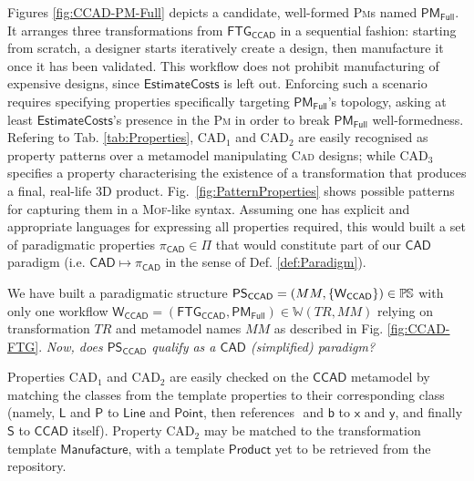 Figures \ref{fig:CCAD-PM-Full} depicts a candidate, well-formed \textsc{Pm}s 
named $\mathsf{PM_{Full}}$.
It arranges three transformations from $\mathsf{FTG_{CCAD}}$ in a sequential 
fashion: starting from scratch, a designer starts iteratively create a
design, then manufacture it once it has been validated. This workflow does not 
prohibit manufacturing of expensive designs, since $\mathsf{EstimateCosts}$ is 
left out.
Enforcing such a scenario requires specifying properties specifically targeting 
$\mathsf{PM_{Full}}$'s topology, asking at least $\mathsf{EstimateCosts}$'s 
presence in the \textsc{Pm} in order to break $\mathsf{PM_{Full}}$ 
well-formedness.
%
Refering to Tab. \ref{tab:Properties}, $\mbox{CAD}_1$ and $\mbox{CAD}_2$ are 
easily recognised as property 
patterns over a metamodel manipulating \textsc{Cad} designs; while 
$\mbox{CAD}_3$ specifies a property characterising the existence of a 
transformation that produces a final, real-life 3D product. Fig.~\ref{fig:PatternProperties} 
shows possible patterns for capturing them in a 
\textsc{Mof}-like syntax. Assuming one has explicit and appropriate languages 
for expressing all properties required, this would built a set of 
paradigmatic properties $\pi_{\mathsf{CAD}}\in\Pi$ that would constitute part of 
our $\mathsf{CAD}$ paradigm (i.e. $\mathsf{CAD} \mapsto \pi_{\mathsf{CAD}}$ in 
the sense of Def. \ref{def:Paradigm}).


We have built a paradigmatic structure $\mathsf{PS_{CCAD}} = (MM, 
\{\mathsf{W_{CCAD}}\})\in\mathbb{P}\mskip-1mu\mathbb{S}$ with only one workflow $\mathsf{W_{CCAD}} = 
(\mathsf{FTG_{CCAD}}, \mathsf{PM_{Full}})\in\mathbb{W}(TR, MM)$ relying on 
transformation $TR$ and metamodel names $MM$ as described in Fig. 
\ref{fig:CCAD-FTG}. \emph{Now, does $\mathsf{PS_{CCAD}}$ qualify as a 
$\mathsf{CAD}$ (simplified) paradigm?}

Properties $\mbox{CAD}_1$ and $\mbox{CAD}_2$ are easily checked on the 
$\mathsf{CCAD}$ metamodel by matching the classes from the template properties 
to their corresponding class (namely, $\mathsf{L}$ and $\mathsf{P}$ to 
$\mathsf{Line}$ and $\mathsf{Point}$, then references $\mathsf{}$ and 
$\mathsf{b}$ to $\mathsf{x}$ and $\mathsf{y}$, and finally $\mathsf{S}$ to 
$\mathsf{CCAD}$ itself). Property $\mbox{CAD}_2$ may be matched to the 
transformation template $\mathsf{Manufacture}$, with a template 
$\mathsf{Product}$ yet to be retrieved from the repository.  

